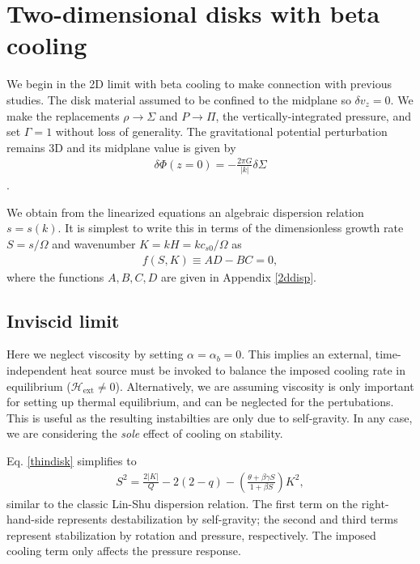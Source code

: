 \section{Two-dimensional disks with beta cooling}
We begin in the 2D limit with beta cooling  to make connection 
with previous studies. The disk
material assumed to be confined to the midplane so $\delta v_z=0$. 
We make the replacements 
$\rho \to \Sigma$ and $P\to\Pi$, the vertically-integrated
pressure, and set $\Gamma=1$ without loss of generality. 
The gravitational potential perturbation remains 3D and its midplane
value is given by    
\begin{align}
  \delta \Phi(z=0) = -\frac{2 \pi G}{|k|}\delta\Sigma
\end{align}
\citep{shu70}.
 
We obtain from the linearized equations 
an algebraic dispersion relation $s = s(k)$. It is simplest
to write this  
in terms of the dimensionless growth rate $S = s/\Omega$ and
wavenumber $K=kH = k c_{s0}/\Omega$ as
\begin{align}\label{thindisk}
  f(S,K)\equiv AD - BC = 0,   
\end{align}
where the functions $A,B,C,D$ are given in Appendix \ref{2ddisp}. 

\subsection{Inviscid limit}\label{2d_inviscid}
Here we neglect viscosity by setting 
$\alpha = \alpha_b = 0$. This implies an external,
time-independent heat source must be invoked to balance the imposed
cooling rate in equilibrium ($\mathcal{H}_\mathrm{ext}\neq 0$). Alternatively, we are assuming 
viscosity is only important for setting up thermal equilibrium, and
can be neglected for the pertubations. This is useful as the resulting
instabilties are only due to self-gravity.  In any case, we are
considering the \emph{sole} effect of cooling on stability. 

Eq. \ref{thindisk} simplifies to  
\begin{align}\label{inviscid}
  S^2 = \frac{2|K|}{Q} - 2(2-q) - \left(\frac{\theta + \beta \gamma
    S}{1+\beta S}\right)K^2, 
\end{align}
similar to the classic Lin-Shu dispersion relation. The first term on
the right-hand-side represents destabilization by self-gravity; 
the second and third terms represent stabilization by rotation and
pressure, respectively. The imposed cooling term only affects the
pressure response. 

